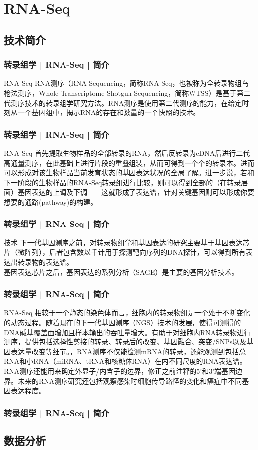 \section{RNA-Seq}
\subsection{技术简介}
\begin{frame}[label=current]
  \frametitle{转录组学 | RNA-Seq | 简介}
  \begin{block}{RNA-Seq}
 RNA测序（RNA Sequencing，简称RNA-Seq，也被称为全转录物组鸟枪法测序，Whole Transcriptome Shotgun Sequencing，简称WTSS）是基于第二代测序技术的转录组学研究方法。RNA测序是使用第二代测序的能力，在给定时刻从一个基因组中，揭示RNA的存在和数量的一个快照的技术。
  \end{block}
\end{frame}

\begin{frame}[label=current]
  \frametitle{转录组学 | RNA-Seq | 简介}
  \begin{block}{RNA-Seq}
首先提取生物样品的全部转录的RNA，然后反转录为cDNA后进行二代高通量测序，在此基础上进行片段的重叠组装，从而可得到一个个的转录本。进而可以形成对该生物样品当前发育状态的基因表达状况的全局了解。进一步说，若和下一阶段的生物样品的RNA-Seq转录组进行比较，则可以得到全部的（在转录层面）基因表达的上调及下调——这就形成了表达谱，针对关键基因则可以形成你要想要的通路(pathway)的构建。
  \end{block}
\end{frame}

\begin{frame}[label=current]
  \frametitle{转录组学 | RNA-Seq | 简介}
  \begin{block}{技术}
下一代基因测序之前，对转录物组学和基因表达的研究主要基于基因表达芯片（微阵列），后者包含数以千计用于探测靶向序列的DNA探针，可以得到所有表达出转录物的表达谱。\\
\vspace{1em}
基因表达芯片之后，基因表达的系列分析（SAGE）是主要的基因分析技术。
  \end{block}
\end{frame}

\begin{frame}[label=current]
  \frametitle{转录组学 | RNA-Seq | 简介}
  \begin{block}{RNA-Seq}
相较于一个静态的染色体而言，细胞内的转录物组是一个处于不断变化的动态过程。随着现在的下一代基因测序（NGS）技术的发展，使得可测得的DNA碱基覆盖面增加且样本输出的吞吐量增大。有助于对细胞内RNA转录物进行测序，提供包括选择性剪接的转录、转录后的改变、基因融合、突变/SNPs以及基因表达量改变等细节。，RNA测序不仅能检测mRNA的转录，还能观测到包括总RNA和小RNA（miRNA、tRNA和核糖体RNA）在内不同尺度的RNA表达谱。RNA测序还能用来确定外显子/内含子的边界，修正之前注释的5'和3'端基因边界。未来的RNA测序研究还包括观察感染时细胞传导路径的变化和癌症中不同基因表达程度。
  \end{block}
\end{frame}

\begin{frame}[label=current]
  \frametitle{转录组学 | RNA-Seq | 简介}
\end{frame}

\subsection{数据分析}
